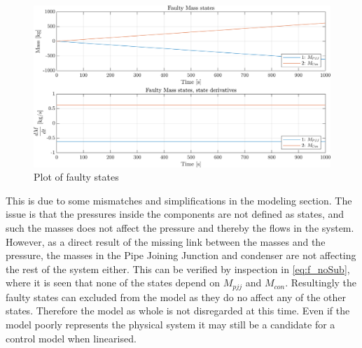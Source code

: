 \begin{figure}[h]
	\centering
	\includegraphics[width=1\textwidth]{Graphics/nonlin_sim_faulty_Mass.png}
	\caption{Plot of faulty states}
	\label{fig:non_lin_sim_faulty_Mass}
\end{figure}
This is due to some mismatches and simplifications in the modeling section. The issue is that the pressures inside the components are not defined as states, and such the masses does not affect the pressure and thereby the flows in the system. However, as a direct result of the missing link between the masses and the pressure, the masses in the Pipe Joining Junction and condenser are not affecting the rest of the system either. This can be verified by inspection in \cref{eq:f_noSub}, where it is seen that none of the states depend on $M_{pjj}$ and $M_{con}$. Resultingly the faulty states can excluded from the model as they do no affect any of the other states. Therefore the model as whole is not disregarded at this time. Even if the model poorly represents the physical system it may still be a candidate for a control model when linearised. \\


